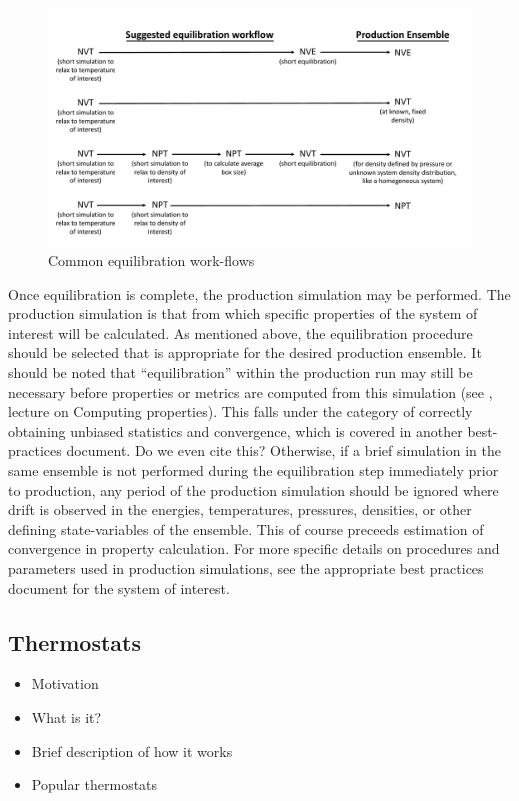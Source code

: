 \documentclass[9pt,bestpractices]{livecoms}
\begin{document}
\begin{figure}[h]
\centering
\includegraphics[width=\linewidth]{Equilibration_Workflow.pdf}
\caption{Common equilibration work-flows}
\label{eqworkflow}
\end{figure}

Once equilibration is complete, the production simulation may be performed.
The production simulation is that from which specific properties of the system of interest will be calculated.
As mentioned above, the equilibration procedure should be selected that is appropriate for the desired production ensemble.
It should be noted that ``equilibration'' within the production run may still be necessary before properties or metrics are computed from this simulation (see \citet{ShellNotes}, lecture on Computing properties).
This falls under the category of correctly obtaining unbiased statistics and
convergence, which is covered in another best-practices document. %
Do we even cite this?
Otherwise, if a brief simulation in the same ensemble is not performed during the equilibration step immediately prior to production, any period of the production simulation should be ignored where drift is observed in the energies, temperatures, pressures, densities, or other defining state-variables of the ensemble.
This of course preceeds estimation of convergence in property calculation.
For more specific details on procedures and parameters used in production simulations, see the appropriate best practices document for the system of interest.

\subsection{Thermostats}
\label{sec:thermostats}
\begin{itemize}
\item Motivation
\item What is it?
\item Brief description of how it works
\item Popular thermostats
\end{itemize}
\end{document}
